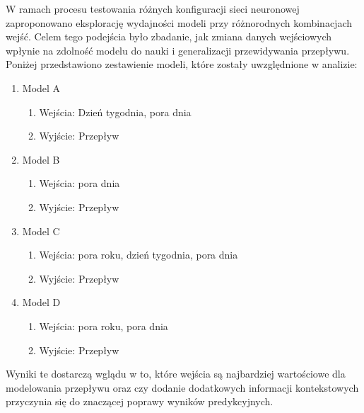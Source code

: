 \documentclass[a4paper,twoside,12pt]{book}
\begin{document}
W ramach procesu testowania różnych konfiguracji sieci neuronowej zaproponowano eksplorację wydajności modeli przy różnorodnych kombinacjach wejść. Celem tego podejścia było zbadanie, jak zmiana danych wejściowych wpłynie na zdolność modelu do nauki i generalizacji przewidywania przepływu. Poniżej przedstawiono zestawienie modeli, które zostały uwzględnione w analizie:

\begin{enumerate}
  \item Model A
        \begin{enumerate}
          \item Wejścia: Dzień tygodnia, pora dnia
          \item Wyjście: Przepływ
        \end{enumerate}
  \item Model B
        \begin{enumerate}
          \item Wejścia: pora dnia
          \item Wyjście: Przepływ
        \end{enumerate}
  \item Model C
        \begin{enumerate}
          \item Wejścia: pora roku, dzień tygodnia, pora dnia
          \item Wyjście: Przepływ
        \end{enumerate}
  \item Model D
        \begin{enumerate}
          \item Wejścia: pora roku, pora dnia
          \item Wyjście: Przepływ
        \end{enumerate}
\end{enumerate}

Wyniki te dostarczą wglądu w to, które wejścia są najbardziej wartościowe dla modelowania przepływu oraz czy dodanie dodatkowych informacji kontekstowych przyczynia się do znaczącej poprawy wyników predykcyjnych.
\end{document}
